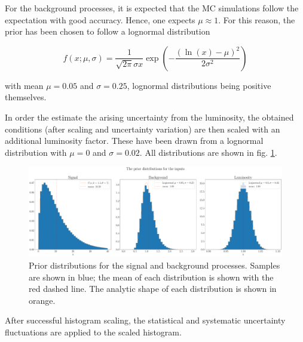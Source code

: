 For the background processes, it is expected that the MC simulations follow the expectation with good accuracy. Hence, one expects $\mu \approx 1$. For this reason, the prior has been chosen to follow a lognormal distribution

\begin{equation*}
	f(x; \mu, \sigma) = \frac{1}{\sqrt{2\pi }\sigma x}\exp\left(-\frac{\left(\ln(x)-\mu\right)^2}{2\sigma^2}\right)
\end{equation*}

with mean $\mu = 0.05$ and $\sigma = 0.25$, lognormal distributions being positive themselves.

In order the estimate the arising uncertainty from the luminosity, the obtained conditions (after scaling and uncertainty variation) are then scaled with an additional luminosity factor. These have been drawn from a lognormal distribution with $\mu = 0$ and $\sigma = 0.02$.
All distributions are shown in fig. \ref{fig:priors}.

\begin{figure}[h!]
	\centering
	\includegraphics[width=\linewidth]{figures/network_setup/priors.pdf}
	\caption{Prior distributions for the signal and background processes. Samples are shown in blue; the mean of each distribution is shown with the red dashed line. The analytic shape of each distribution is shown in orange.}
	\label{fig:priors}
\end{figure}

After successful histogram scaling, the statistical and systematic uncertainty fluctuations are applied to the scaled histogram.


